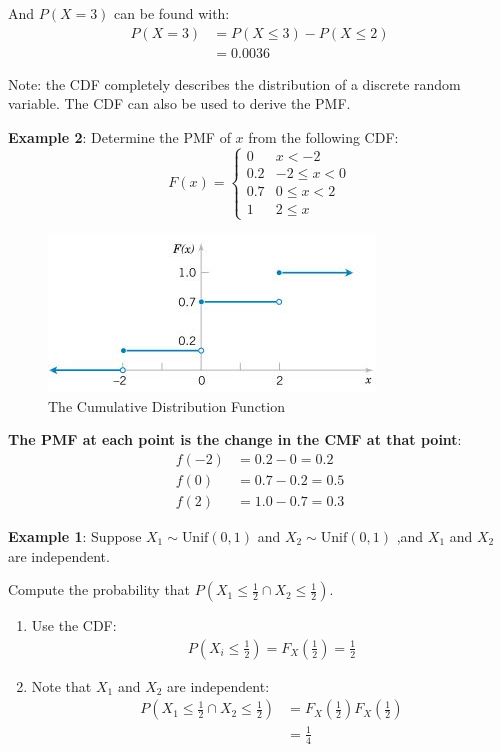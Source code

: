 \documentclass[10pt,a4paper]{article}
\begin{document}
And $P(X=3)$ can be found with:
\begin{align*}
    P(X=3) &= P(X\leq 3) - P(X\leq 2) \\
    &= 0.0036
\end{align*}
    
Note: the CDF completely describes the distribution of a discrete random variable. The CDF can also be used to derive the PMF.

\textbf{Example 2}: Determine the PMF of $x$ from the following CDF:
$$
    F(x) = 
    \begin{cases}
        0 & x < -2 \\ 
        0.2 & -2\leq x < 0 \\
        0.7 & 0 \leq x < 2 \\
        1 & 2\leq x
    \end{cases}
$$

\begin{figure} [h!]
    \centering
    \includegraphics[]{Ex2_1.JPG}
    \caption{The Cumulative Distribution Function}
\end{figure}

\textbf{The PMF at each point is the change in the CMF at that point}:
\begin{align*}
    f(-2) &= 0.2 - 0 = 0.2 \\
    f(0) &= 0.7 - 0.2 = 0.5 \\
    f(2) &= 1.0 - 0.7 = 0.3
\end{align*}

\textbf{Example 1}: Suppose $X_1 \sim \text{Unif}(0,1)$ and $X_2 \sim \text{Unif}(0,1)$ ,and $X_1$
and $X_2$ are independent.

Compute the probability that $P(X_1\leq \frac{1}{2} \cap X_2 \leq \frac{1}{2})$.
\begin{enumerate}
    \item Use the CDF:
    \begin{align*}
        P\left(X_i \leq \frac{1}{2}\right) = F_X\left(\frac{1}{2}\right) = \frac{1}{2}
    \end{align*}
    \item Note that $X_1$ and $X_2$ are independent:
    \begin{align*}
        P\left(X_1 \leq \frac{1}{2} \cap X_2 \leq \frac{1}{2}\right) &= F_X\left(\frac{1}{2}\right)F_X\left(\frac{1}{2}\right) \\
        &= \frac{1}{4}
    \end{align*}
\end{enumerate}
\end{document}
